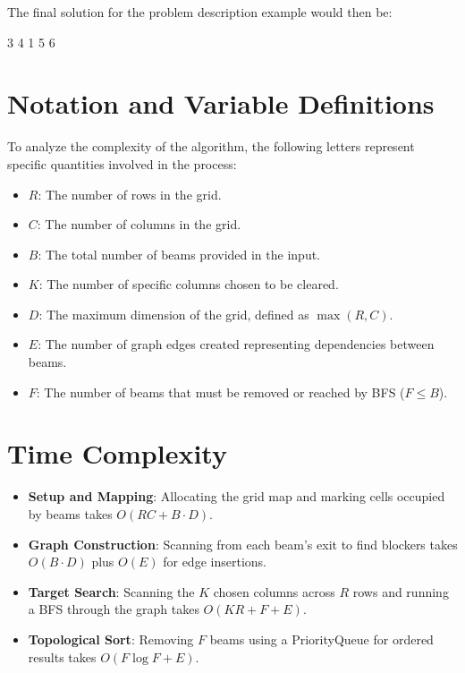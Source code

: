 \documentclass[runningheads]{llncs}
\begin{document}
The final solution for the problem description example would then be:

\begin{center}
	3 4 1 5 6
\end{center}



\section{Notation and Variable Definitions}

To analyze the complexity of the algorithm, the following letters represent specific quantities involved in the process:

\begin{itemize}
    \item \textbf{$R$}: The number of rows in the grid.
    \item \textbf{$C$}: The number of columns in the grid.
    \item \textbf{$B$}: The total number of beams provided in the input.
    \item \textbf{$K$}: The number of specific columns chosen to be cleared.
    \item \textbf{$D$}: The maximum dimension of the grid, defined as $\max(R, C)$.
    \item \textbf{$E$}: The number of graph edges created representing dependencies between beams.
    \item \textbf{$F$}: The number of beams that must be removed or reached by BFS ($F \le B$).
\end{itemize}

\section{Time Complexity}

\begin{itemize}
    \item \textbf{Setup and Mapping}: Allocating the grid map and marking cells occupied by beams takes $O(RC + B \cdot D)$.
    \item \textbf{Graph Construction}: Scanning from each beam's exit to find blockers takes $O(B \cdot D)$ plus $O(E)$ for edge insertions.
    \item \textbf{Target Search}: Scanning the $K$ chosen columns across $R$ rows and running a BFS through the graph takes $O(KR + F + E)$.
    \item \textbf{Topological Sort}: Removing $F$ beams using a PriorityQueue for ordered results takes $O(F \log F + E)$.
\end{itemize}
\end{document}
